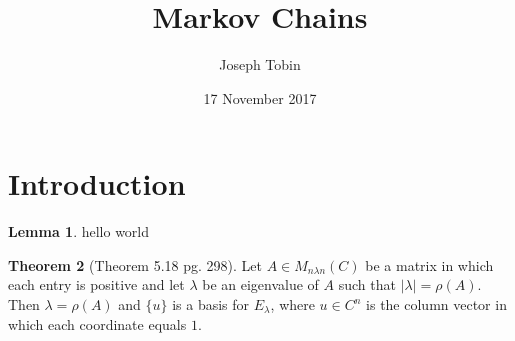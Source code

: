 \documentclass{amsart}
\title{Markov Chains}
\author{Joseph Tobin}
\date{17 November 2017}
\theoremstyle{definition}
\newtheorem{theorem}{Theorem}
\newtheorem{lemma}[theorem]{Lemma}
\theoremstyle{remark}
\numberwithin{equation}{section}
\begin{document}
\maketitle




\section{Introduction}

\begin{lemma}
hello world

\end{lemma}

\begin{theorem}[Theorem 5.18 pg. 298]
Let $A \in M_{n \lambda n} (C)$ be a matrix in which each entry is positive and let $\lambda$ be an eigenvalue of $A$ such that $| \lambda | = \rho(A)$.
Then $\lambda = \rho(A)$ and $\{ u \}$ is a basis for $E_{\lambda}$, where $u \in C^n$ is the column vector in which each coordinate equals $1$.

\end{theorem}
\end{document}
